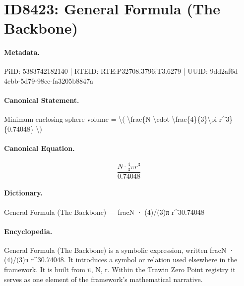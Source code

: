 \section*{ID8423: General Formula (The Backbone)}
\paragraph{Metadata.}
PiID: 5383742182140 | RTEID: RTE:P32708.3796:T3.6279 | UUID: 9dd2af6d-4ebb-5d79-98ce-fa3205b8847a

\paragraph{Canonical Statement.}
Minimum enclosing sphere volume = \textbackslash{}( \textbackslash{}frac\{N \textbackslash{}cdot \textbackslash{}frac\{4\}\{3\}\textbackslash{}pi r\textasciicircum{}3\}\{0.74048\} \textbackslash{})

\paragraph{Canonical Equation.}
\[
\frac{N \cdot \frac{4}{3}\pi r^3}{0.74048}
\]

\paragraph{Dictionary.}
General Formula (The Backbone) — fracN · (4)/(3)π r\textasciicircum{}30.74048

\paragraph{Encyclopedia.}
General Formula (The Backbone) is a symbolic expression, written fracN · (4)/(3)π r\textasciicircum{}30.74048. It introduces a symbol or relation used elsewhere in the framework. It is built from π, N, r. Within the Trawin Zero Point registry it serves as one element of the framework's mathematical narrative.

